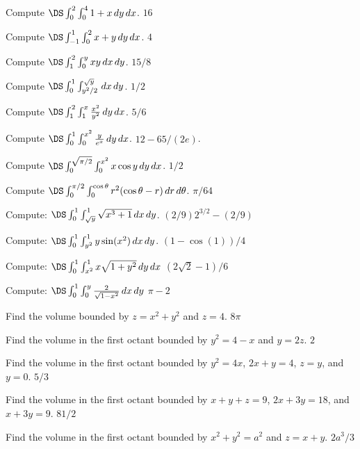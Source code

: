 \begin{multicols}{2}


\problem Compute $\DS \int_{0}^{2}\int_{0}^{4} 1+x \,dy\,dx$. %
\answer
$16$
\endanswer

\problem Compute $\DS \int_{-1}^{1}\int_{0}^{2} x+y\,dy\,dx$. %
\answer
$4$
\endanswer


\problem Compute $\DS \int_{1}^{2}\int_{0}^{y} xy \,dx\,dy$. %
\answer
$15/8$
\endanswer


\problem Compute $\DS \int_{0}^{1}\int_{y^2/2}^{\sqrt y} \,dx\,dy$. %
\answer
$1/2$
\endanswer


\problem Compute $\DS \int_{1}^{2}\int_{1}^{x} {x^2\over y^2}\,dy\,dx$. %
\answer
$5/6$
\endanswer


\problem Compute $\DS \int_{0}^{1}\int_{0}^{x^2} {y\over e^x}\,dy\,dx$. %
\answer
$12-65/(2e)$.
\endanswer


\problem Compute $\DS \int_{0}^{\sqrt{\pi/2}}\int_{0}^{x^2} x\cos y\,dy\,dx$. %
\answer
$1/2$
\endanswer


\problem Compute $\DS \int_{0}^{\pi/2}\int_{0}^{\cos\theta}r^2 %
(\cos\theta-r) \,dr\,d\theta$.
\answer
$\pi/64$
\endanswer

\problem  Compute: $\DS \int_0^1\int_{\sqrt{y}}^1  %
\sqrt{x^3+1}\,dx\,dy$.
\answer
$(2/9)2^{3/2}-(2/9)$
\endanswer

\problem Compute: $\DS \int_0^1\int_{y^2}^1  %
y\sin(x^2)\,dx\,dy$.
\answer
$(1-\cos(1))/4$
\endanswer

\problem Compute: $\DS \int_0^1 \int_{x^2}^1 x\sqrt{1+y^2}\,dy\,dx$ %
\answer
$(2\sqrt2-1)/6$
\endanswer

\problem Compute: $\DS \int_0^1 \int_0^y %
{2\over\sqrt{1-x^2}}\,dx\,dy$
\answer
$\pi-2$
\endanswer

\problem Find the volume bounded by $z=x^2+y^2$ and $z=4$. %
\answer
$8\pi$
\endanswer


\problem Find the volume in the first octant %
bounded by $y^2=4-x$ and $y=2z$.
\answer
$2$
\endanswer


\problem Find the volume in the first octant %
bounded by $y^2=4x$, $2x+y=4$, $z=y$,
and $y=0$.
\answer
$5/3$
\endanswer

\problem Find the volume in the first octant %
bounded by $x+y+z=9$, $2x+3y=18$, and $x+3y=9$.
\answer
$81/2$
\endanswer

\problem Find the volume in the first octant %
bounded by $x^2+y^2=a^2$ and $z=x+y$.
\answer
$2a^3/3$
\endanswer


\end{multicols}

